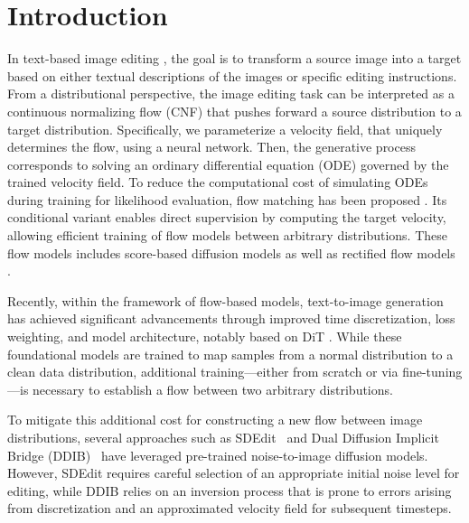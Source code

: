 \section{Introduction}
In text-based image editing \cite{meng2021sdedit, mokady2023null, tumanyan2023plug, hertz2023delta, kim2024dreamsampler, kulikov2024flowedit, brooks2023instructpix2pix}, the goal is to transform a source image into a target  based on either textual descriptions of the images or specific editing instructions.
From a distributional perspective, the image editing task can be interpreted as a continuous normalizing flow (CNF)  \cite{papamakarios2021normalizing} that pushes forward a source distribution to a target distribution.
Specifically, we parameterize a velocity field, that uniquely determines the flow, using a neural network. Then, the generative process corresponds to solving an ordinary differential equation (ODE) governed by the trained velocity field.
To reduce the computational cost of simulating ODEs during training for likelihood evaluation, flow matching has been proposed \cite{lipman2023flow}. Its conditional variant enables direct supervision by computing the target velocity, allowing efficient training of flow models between arbitrary distributions.
These flow models includes score-based diffusion models \cite{song2020score,ho2020denoising, song2020denoising} as well as rectified flow models \cite{liu2023flow, esser2024scaling}.

Recently, within the framework of flow-based models, text-to-image generation has achieved significant advancements through improved time discretization, loss weighting, and model architecture, notably based on DiT \cite{peebles2023scalable}. While these foundational models are trained to map samples from a normal distribution to a clean data distribution, additional training—either from scratch or via fine-tuning—is necessary to establish a flow between two arbitrary distributions.

To mitigate this additional cost for constructing a new flow between image distributions, several approaches such as SDEdit~\cite{meng2021sdedit} and Dual Diffusion Implicit Bridge (DDIB)~\cite{su2022dual} have leveraged pre-trained noise-to-image diffusion models.
However, SDEdit requires careful selection of an appropriate initial noise level for editing, while DDIB relies on an inversion process that is prone to errors arising from discretization and an approximated velocity field for subsequent timesteps. 

